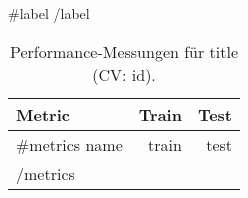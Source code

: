 \begin{table}[ht]
  \centering
  \caption{Performance-Messungen für {{title}} (CV: {{id}}). }
  {{#label}}
  \label{tab:{{label}}-performance}
  {{/label}}
  \begin{tabular}{lrr}
    \toprule
    Metric & Train&Test\\
    \midrule
    {{#metrics}}
      {{name}} & {{train}} & {{test}}  \\
    {{/metrics}}
    \bottomrule
  \end{tabular}
\end{table}
